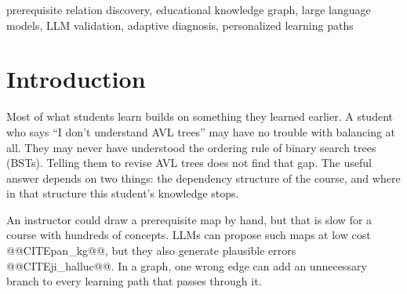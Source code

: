 \documentclass[conference]{IEEEtran}
\begin{document}
\begin{abstract}
Students often struggle with an advanced topic because they missed something it depends on, yet course material rarely says which concepts depend on which, or which gap a particular student has. Large language models (LLMs) can propose prerequisite relations cheaply, but they also propose relations that sound right without being needed. We present a system that goes from raw course files to a personalized learning path. An LLM proposes prerequisite edges, and an independent validation agent checks each one against retrieved course text, a second model and graph-consistency rules, then accepts it, rejects it or sends it for human review. A short adaptive quiz over the validated graph estimates what a student knows, a tracer suggests which concept caused a wrong answer, and the student receives a path with cited sources. We also study a counterfactual ``necessity test'' in which an LLM simulates a learner who lacks a concept. This paper reports the design and preliminary findings. The necessity test was unstable across settings on three example edges, so it does not influence decisions in the current agent. A real-textbook run exposed prompt truncation and an order bias in discovery, which we corrected in the design. On 500 simulated students over a five-concept example graph, adaptive diagnosis used 14.4\% fewer questions than asking every concept at similar accuracy (0.866 vs. 0.870), but only when student knowledge followed the graph. The main evaluation of validation on public benchmarks and full courses is pending.
\end{abstract}
\begin{IEEEkeywords}
prerequisite relation discovery, educational knowledge graph, large language models, LLM validation, adaptive diagnosis, personalized learning paths
\end{IEEEkeywords}
\section{Introduction}
Most of what students learn builds on something they learned earlier. A student who says ``I don't understand AVL trees'' may have no trouble with balancing at all. They may never have understood the ordering rule of binary search trees (BSTs). Telling them to revise AVL trees does not find that gap. The useful answer depends on two things: the dependency structure of the course, and where in that structure this student's knowledge stops.

An instructor could draw a prerequisite map by hand, but that is slow for a course with hundreds of concepts. LLMs can propose such maps at low cost @@CITEpan\_kg@@, but they also generate plausible errors @@CITEji\_halluc@@. In a graph, one wrong edge can add an unnecessary branch to every learning path that passes through it.
\end{document}
